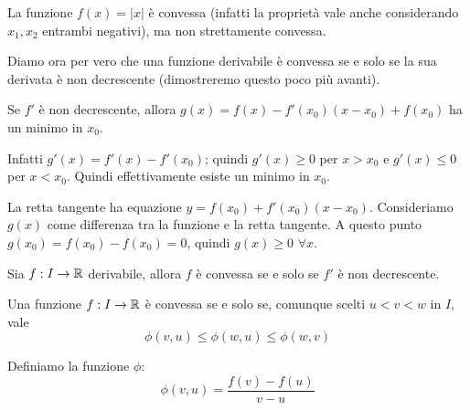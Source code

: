 \begin{example}
La funzione $f(x) = |x|$ è convessa (infatti la proprietà vale anche considerando $x_1, x_2$ entrambi negativi), ma non strettamente convessa.
\begin{center}
\end{center}
\end{example}

Diamo ora per vero che una funzione derivabile è convessa se e solo se la sua derivata è non decrescente (dimostreremo questo poco più avanti).

Se $f'$ è non decrescente, allora $g(x) = f(x)-f'(x_0)(x-x_0) + f(x_0)$ ha un minimo in $x_0$.

Infatti $g'(x) = f'(x)-f'(x_0)$; quindi $g'(x) \ge 0$ per $x > x_0$ e $g'(x) \le 0$ per $x < x_0$. Quindi effettivamente esiste un minimo in $x_0$.

\begin{center}
\end{center}

La retta tangente ha equazione $y = f(x_0)+f'(x_0)(x-x_0)$. Consideriamo $g(x)$ come differenza tra la funzione e la retta tangente. A questo punto $g(x_0) = f(x_0) - f(x_0) = 0$, quindi $g(x) \ge 0$ $\forall x$.

\begin{theorem}
Sia $f: I \to \mathbb R$ derivabile, allora $f$ è convessa se e solo se $f'$ è non decrescente.
\end{theorem}

\begin{lemma}
Una funzione $f: I \to \mathbb R$ è convessa se e solo se, comunque scelti $u < v < w$ in $I$, vale
\begin{equation*}
\phi (v,u) \le \phi(w,u) \le \phi(w,v)
\end{equation*}
\end{lemma}

Definiamo la funzione $\phi$:
\begin{equation*}
\phi(v,u) = \frac{f(v)-f(u)}{v-u}
\end{equation*}

